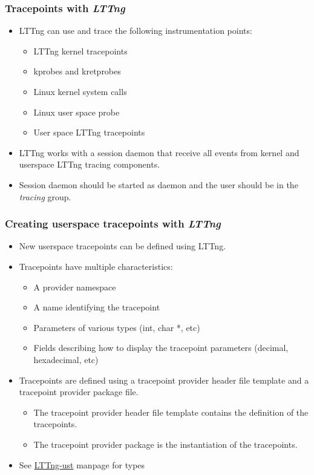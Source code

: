 \begin{frame}
  \frametitle{Tracepoints with {\em LTTng} }
  \begin{itemize}
    \item LTTng can use and trace the following instrumentation points:
    \begin{itemize}
      \item LTTng kernel tracepoints
      \item kprobes and kretprobes
      \item Linux kernel system calls
      \item Linux user space probe
      \item User space LTTng tracepoints
    \end{itemize}
    \item LTTng works with a session daemon that receive all events from kernel
          and userspace LTTng tracing components.
    \item Session daemon should be started as daemon and the user should be in
          the {\em tracing} group.
  \end{itemize}
\end{frame}

\begin{frame}
  \frametitle{Creating userspace tracepoints with {\em LTTng}}
  \begin{itemize}
    \item New userspace tracepoints can be defined using LTTng.
    \item Tracepoints have multiple characteristics:
    \begin{itemize}
      \item A provider namespace
      \item A name identifying the tracepoint
      \item Parameters of various types (int, char *, etc)
      \item Fields describing how to display the tracepoint parameters
            (decimal, hexadecimal, etc)
    \end{itemize}
    \item Tracepoints are defined using a tracepoint provider header file
          template and a tracepoint provider package file.
    \begin{itemize}
      \item The tracepoint provider header file template contains the definition
            of the tracepoints.
      \item The tracepoint provider package is the instantiation of the
            tracepoints.
    \end{itemize}
    \item See \href{https://lttng.org/man/3/lttng-ust/v2.13/}{LTTng-ust} manpage
          for types
  \end{itemize}
\end{frame}

